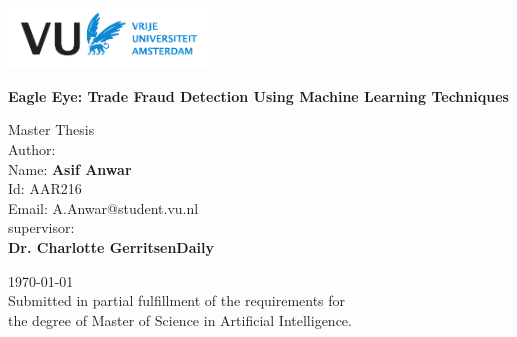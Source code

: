 \begin{titlepage}
    \begin{center}
    \vspace{0.8cm}
        \includegraphics[width=0.4\textwidth]{figures/vua.pdf}
        \vspace*{1cm}
        
        \Huge
        \textbf{Eagle Eye: Trade Fraud Detection Using Machine Learning Techniques}
        
        \vspace{0.5cm}
        \LARGE
        Master Thesis \\
        
        
        \vspace{2.5cm}
        \large
        Author: \\
        \vspace{0.25cm}
        \Large
        Name: \textbf{Asif Anwar}\\
        \vspace{0.25cm}
        \large
        Id: AAR216\\
        \vspace{0.25cm}
        Email: A.Anwar@student.vu.nl\\
        
        \vspace{1.5cm}
        \large
        supervisor: \\
        \vspace{0.25cm}
        \Large
        \textbf{Dr. Charlotte GerritsenDaily}
        

        
        \vfill 
        
        \today \\
        \vspace{0.5cm}
        Submitted in partial fulfillment of the requirements for\\ 
        the degree of Master of Science in Artificial Intelligence. 
        
        \vspace{1cm}
        
   
        
        \vspace{2.5cm}
        
        
    \end{center}
\end{titlepage}